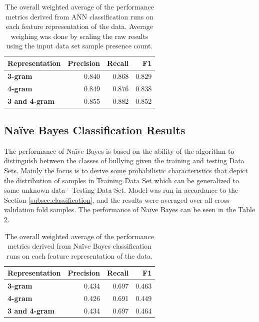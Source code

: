 \documentclass[conference]{sig-alternate-05-2015}
\begin{document}
\begin{table}[ht!]
  \centering
  \begin{tabular}{| l | r | r | r |}
    \hline
    \textbf{Representation} & \textbf{Precision} & \textbf{Recall} & \textbf{F1} \\
    \hline\hline
    \textbf{3-gram} & 0.840 & 0.868 & 0.829 \\
    \hline
    \textbf{4-gram} & 0.849 & 0.876 & 0.838 \\
    \hline
    \textbf{3 and 4-gram} & 0.855 & 0.882 & 0.852 \\
    \hline
  \end{tabular}
  \caption{The overall weighted average of the performance metrics derived from
  ANN classification runs on each feature representation of the data. Average
  weighing was done by scaling the raw results using the input data set sample
  presence count.}
  \label{tab:ann_overall_results}
\end{table}

\subsection{Na\"ive Bayes Classification Results}\label{subsec:bayes_results}
The performance of Na\"ive Bayes is based on the ability of the algorithm to 
distinguish between the classes of bullying given the training and testing Data Sets.
Mainly the focus is to derive some probabilistic characteristics that depict the distribution 
of samples in Training Data Set which can be generalized to some unknown data - Testing Data Set.
Model was run in accordance to the Section \ref{subsec:classification}, and the results
were averaged over all cross-validation fold samples. The performance of Na\"ive Bayes can be 
seen in the Table \ref{tab:bayes_overall_results}.


\begin{table}[ht!]
  \centering
  \begin{tabular}{| l | r | r | r |}
    \hline
    \textbf{Representation} & \textbf{Precision} & \textbf{Recall} & \textbf{F1} \\
    \hline\hline
    \textbf{3-gram} & 0.434 & 0.697 & 0.463 \\
    \hline
    \textbf{4-gram} & 0.426 & 0.691 & 0.449 \\
    \hline
    \textbf{3 and 4-gram} & 0.434 & 0.697 & 0.464 \\
    \hline
  \end{tabular}
  \caption{The overall weighted average of the performance metrics derived from
  Na\"ive Bayes classification runs on each feature representation of the data.}
  \label{tab:bayes_overall_results}
\end{table}
\end{document}
